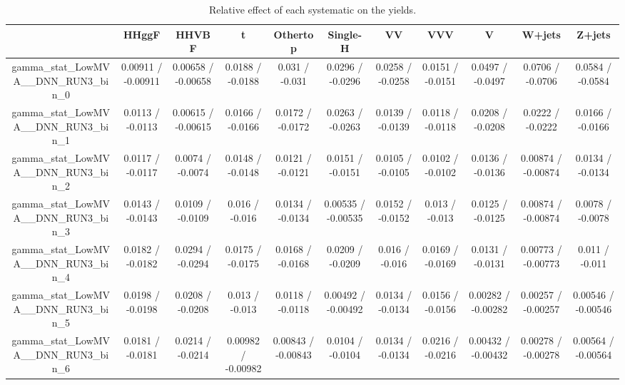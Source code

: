 \documentclass[10pt]{article}
\begin{document}
\begin{table}[htbp]
\begin{center}
\begin{tabular}{|c|c|c|c|c|c|c|c|c|c|c|}
\hline 
      & HHggF      & HHVBF      & t      & Othertop      & Single-H      & VV      & VVV      & V      & W+jets      & Z+jets \\ 
\hline 
  gamma_stat_LowMVA__DNN_RUN3_bin_0 & 0.00911 / -0.00911 & 0.00658 / -0.00658 & 0.0188 / -0.0188 & 0.031 / -0.031 & 0.0296 / -0.0296 & 0.0258 / -0.0258 & 0.0151 / -0.0151 & 0.0497 / -0.0497 & 0.0706 / -0.0706 & 0.0584 / -0.0584 \\ 
  gamma_stat_LowMVA__DNN_RUN3_bin_1 & 0.0113 / -0.0113 & 0.00615 / -0.00615 & 0.0166 / -0.0166 & 0.0172 / -0.0172 & 0.0263 / -0.0263 & 0.0139 / -0.0139 & 0.0118 / -0.0118 & 0.0208 / -0.0208 & 0.0222 / -0.0222 & 0.0166 / -0.0166 \\ 
  gamma_stat_LowMVA__DNN_RUN3_bin_2 & 0.0117 / -0.0117 & 0.0074 / -0.0074 & 0.0148 / -0.0148 & 0.0121 / -0.0121 & 0.0151 / -0.0151 & 0.0105 / -0.0105 & 0.0102 / -0.0102 & 0.0136 / -0.0136 & 0.00874 / -0.00874 & 0.0134 / -0.0134 \\ 
  gamma_stat_LowMVA__DNN_RUN3_bin_3 & 0.0143 / -0.0143 & 0.0109 / -0.0109 & 0.016 / -0.016 & 0.0134 / -0.0134 & 0.00535 / -0.00535 & 0.0152 / -0.0152 & 0.013 / -0.013 & 0.0125 / -0.0125 & 0.00874 / -0.00874 & 0.0078 / -0.0078 \\ 
  gamma_stat_LowMVA__DNN_RUN3_bin_4 & 0.0182 / -0.0182 & 0.0294 / -0.0294 & 0.0175 / -0.0175 & 0.0168 / -0.0168 & 0.0209 / -0.0209 & 0.016 / -0.016 & 0.0169 / -0.0169 & 0.0131 / -0.0131 & 0.00773 / -0.00773 & 0.011 / -0.011 \\ 
  gamma_stat_LowMVA__DNN_RUN3_bin_5 & 0.0198 / -0.0198 & 0.0208 / -0.0208 & 0.013 / -0.013 & 0.0118 / -0.0118 & 0.00492 / -0.00492 & 0.0134 / -0.0134 & 0.0156 / -0.0156 & 0.00282 / -0.00282 & 0.00257 / -0.00257 & 0.00546 / -0.00546 \\ 
  gamma_stat_LowMVA__DNN_RUN3_bin_6 & 0.0181 / -0.0181 & 0.0214 / -0.0214 & 0.00982 / -0.00982 & 0.00843 / -0.00843 & 0.0104 / -0.0104 & 0.0134 / -0.0134 & 0.0216 / -0.0216 & 0.00432 / -0.00432 & 0.00278 / -0.00278 & 0.00564 / -0.00564 \\ 
\hline 
\end{tabular} 
\caption{Relative effect of each systematic on the yields.} 
\end{center} 
\end{table} 
\end{document}

